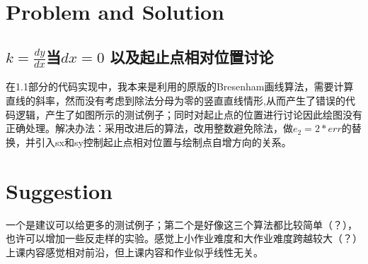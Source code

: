 \documentclass[a4paper,twoside]{article}
\begin{document}
\section{Problem and Solution}
\subsection{ $k= \frac{dy}{dx}$当$dx=0$ 以及起止点相对位置讨论}
在1.1部分的代码实现中，我本来是利用的原版的Bresenham画线算法，需要计算直线的斜率，然而没有考虑到除法分母为零的竖直直线情形,从而产生了错误的代码逻辑，产生了如图所示的测试例子；同时对起止点的位置进行讨论因此绘图没有正确处理。解决办法：采用改进后的算法，改用整数避免除法，做$e_2 = 2 * err$的替换，并引入sx和sy控制起止点相对位置与绘制点自增方向的关系。
\section{ Suggestion}
一个是建议可以给更多的测试例子；第二个是好像这三个算法都比较简单（？），也许可以增加一些反走样的实验。感觉上小作业难度和大作业难度跨越较大（？）上课内容感觉相对前沿，但上课内容和作业似乎线性无关。
\end{document}
